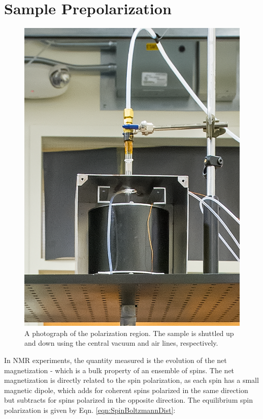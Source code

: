 \documentclass[PaulGanssle-Thesis.tex]{subfiles}
\begin{document}
\section{Sample Prepolarization}
\label{nmr.prepolarization}
\begin{figure}
\vspace*{-0.5\lineheight}
\includegraphics[width=0.4\tw]{figures/magnetometer/PolarizationRegionPhotoSmaller.png}
\caption{A photograph of the polarization region. The sample is shuttled up and down using the central vacuum and air lines, respectively.}
\vspace*{-2\lineheight}
\label{fig:PolarizationRegionPhoto}
\end{figure}
In NMR experiments, the quantity measured is the evolution of the net magnetization - which is a bulk property of an ensemble of spins. The net magnetization is directly related to the spin polarization, as each spin has a small magnetic dipole, which adds for coherent spins polarized in the same direction but subtracts for spins polarized in the opposite direction. The equilibrium spin polarization is given by Eqn. \ref{eqn:SpinBoltzmannDist}:
\end{document}
